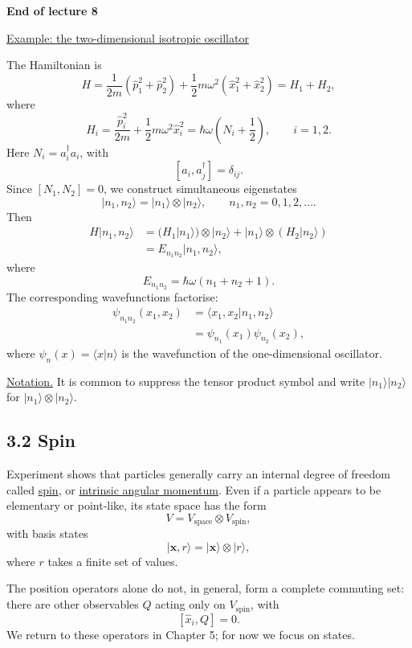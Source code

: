 \documentclass[11pt,a4paper]{article}
\begin{document}
\begin{center}
    \textbf{End of lecture 8}
\end{center}
\medskip
\noindent
\underline{Example: the two-dimensional isotropic oscillator}

The Hamiltonian is
\[
    H=\frac{1}{2m}\left(\hat{p}_1^2+\hat{p}_2^2\right)
      +\frac{1}{2}m\omega^2\left(\hat{x}_1^2+\hat{x}_2^2\right)
      =H_1+H_2,
\]
where
\[
    H_i=\frac{\hat{p}_i^2}{2m}+\frac{1}{2}m\omega^2\hat{x}_i^2
       =\hbar\omega\left(N_i+\frac{1}{2}\right),
    \qquad i=1,2.
\]
Here $N_i=a_i^\dagger a_i$, with
\[
    [a_i,a_j^\dagger]=\delta_{ij}.
\]
Since $[N_1,N_2]=0$, we construct simultaneous eigenstates
\[
    |n_1,n_2\rangle=|n_1\rangle\otimes|n_2\rangle,
    \qquad n_1,n_2=0,1,2,\ldots.
\]
Then
\begin{align*}
    H|n_1,n_2\rangle
        &=(H_1|n_1\rangle)\otimes|n_2\rangle
          +|n_1\rangle\otimes(H_2|n_2\rangle)\\
        &=E_{n_1n_2}|n_1,n_2\rangle,
\end{align*}
where
\[
    E_{n_1n_2}=\hbar\omega(n_1+n_2+1).
\]
The corresponding wavefunctions factorise:
\begin{align*}
    \psi_{n_1n_2}(x_1,x_2)
        &=\langle x_1,x_2|n_1,n_2\rangle\\
        &=\psi_{n_1}(x_1)\psi_{n_2}(x_2),
\end{align*}
where $\psi_n(x)=\langle x|n\rangle$ is the wavefunction of the
one-dimensional oscillator.

\noindent
\underline{Notation.}
It is common to suppress the tensor product symbol and write
$|n_1\rangle|n_2\rangle$ for $|n_1\rangle\otimes|n_2\rangle$.

\subsection*{3.2 Spin}

Experiment shows that particles generally carry an internal degree of
freedom called \underline{spin}, or \underline{intrinsic angular momentum}.
Even if a particle appears to be elementary or point-like, its state
space has the form
\[
    V=V_{\mathrm{space}}\otimes V_{\mathrm{spin}},
\]
with basis states
\[
    |\mathbf{x},r\rangle=|\mathbf{x}\rangle\otimes|r\rangle,
\]
where $r$ takes a finite set of values.

The position operators alone do not, in general, form a complete
commuting set: there are other observables $Q$ acting only on
$V_{\mathrm{spin}}$, with
\[
    [\hat{x}_i,Q]=0.
\]
We return to these operators in Chapter 5; for now we focus on states.
\end{document}
